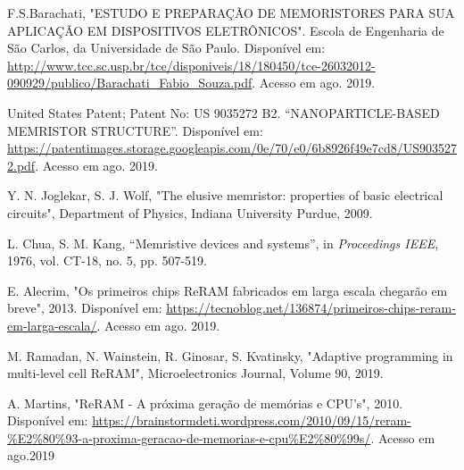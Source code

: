 \documentclass{ceel}
\begin{document}
\begin{multicols}{2}
\begin{thebibliography}{9}
   F.S.Barachati, "ESTUDO E PREPARAÇÃO DE MEMORISTORES PARA SUA APLICAÇÃO EM DISPOSITIVOS ELETRÔNICOS". Escola de Engenharia de São Carlos, da Universidade de São Paulo. Disponível em: \url{http://www.tcc.sc.usp.br/tce/disponiveis/18/180450/tce-26032012-090929/publico/Barachati_Fabio_Souza.pdf}. 
   Acesso em ago. 2019.   

    United States Patent; Patent No: US 9035272 B2. “NANOPARTICLE-BASED MEMRISTOR STRUCTURE”. Disponível em: \url{https://patentimages.storage.googleapis.com/0e/70/e0/6b8926f49e7cd8/US9035272.pdf}. Acesso em ago. 2019.
    

    Y. N. Joglekar, S. J. Wolf, "The elusive memristor: properties of basic electrical circuits", Department of Physics, Indiana University Purdue, 2009.

    L. Chua, S. M. Kang,
    “Memristive devices and systems”, 
    in \emph{Proceedings IEEE}, 1976, vol. CT-18, no. 5, pp. 507-519.


   E. Alecrim, "Os primeiros chips ReRAM fabricados em larga escala chegarão em breve", 2013. Disponível em: \url{https://tecnoblog.net/136874/primeiros-chips-reram-em-larga-escala/}. Acesso em ago. 2019.
   
    M. Ramadan, N. Wainstein, R. Ginosar, S. Kvatinsky, "Adaptive programming in multi-level cell ReRAM", Microelectronics Journal, Volume 90, 2019. %
    
A. Martins, "ReRAM - A próxima geração de memórias e CPU’s", 2010. Disponível em: \url{https://brainstormdeti.wordpress.com/2010/09/15/reram-\%E2\%80\%93-a-proxima-geracao-de-memorias-e-cpu\%E2\%80\%99s/}. Acesso em ago.2019



\end{thebibliography}


\end{multicols}
\end{document}
